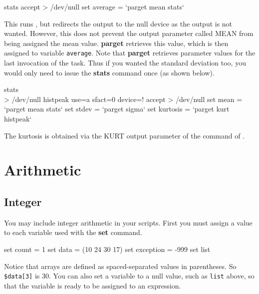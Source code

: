 \documentclass[twoside,11pt,nolof]{starlink}
\providecommand{\ESPref}{\xref{{\footnotesize ESP}}{sun180}{}}
\begin{document}
\begin{small}
\begin{terminalv}
     stats accept > /dev/null
     set average = `parget mean stats`
\end{terminalv}
\end{small}
This runs , but redirects the output
to the null device as the output is not wanted.  However, this does
not prevent the output parameter called MEAN from being assigned the
mean value.  \textbf{parget} retrieves this value, which is then assigned
to variable \texttt{average}.  Note that \textbf{parget} retrieves parameter
values for the last invocation of the task.  Thus if you wanted the
standard deviation too, you would only need to issue the \textbf{stats}
command once (as shown below).

\begin{small}
\begin{terminalv}
     stats \\ > /dev/null
     histpeak use=a sfact=0 device=! accept > /dev/null
     set mean = `parget mean stats`
     set stdev = `parget sigma`
     set kurtosis = `parget kurt histpeak`
\end{terminalv}
\end{small}
The kurtosis is obtained via the KURT output parameter of the  command of \ESPref.

\newpage
\section{Arithmetic\label{sc4_se_csharith}}

\subsection{Integer\label{sc4_se_integer}}

You may include integer arithmetic in your scripts.  First you must
assign a value to each variable used with the \textbf{set} command.

\begin{small}
\begin{terminalv}
     set count = 1
     set data = (10 24 30 17)
     set exception = -999
     set list
\end{terminalv}
\end{small}

Notice that arrays are defined as spaced-separated values in
parentheses.  So \texttt{\$data[3]} is 30.  You can also set a variable
to a null value, such as \texttt{list} above, so that the variable is
ready to be assigned to an expression.
\end{document}
